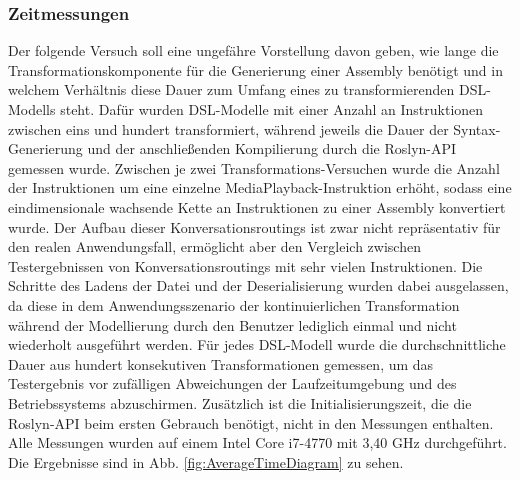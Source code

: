 \subsubsection{Zeitmessungen}
Der folgende Versuch soll eine ungefähre Vorstellung davon geben, wie lange die Transformationskomponente für die Generierung einer Assembly benötigt und in welchem Verhältnis diese Dauer zum Umfang eines zu transformierenden DSL-Modells steht. Dafür wurden DSL-Modelle mit einer Anzahl an Instruktionen zwischen eins und hundert transformiert, während jeweils die Dauer der Syntax-Generierung und der anschließenden Kompilierung durch die Roslyn-API gemessen wurde. Zwischen je zwei Transformations-Versuchen wurde die Anzahl der Instruktionen um eine einzelne MediaPlayback-Instruktion erhöht, sodass eine eindimensionale wachsende Kette an Instruktionen zu einer Assembly konvertiert wurde. Der Aufbau dieser Konversationsroutings ist zwar nicht repräsentativ für den realen Anwendungsfall, ermöglicht aber den Vergleich zwischen Testergebnissen von Konversationsroutings mit sehr vielen Instruktionen. Die Schritte des Ladens der Datei und der Deserialisierung wurden dabei ausgelassen, da diese in dem Anwendungsszenario der kontinuierlichen Transformation während der Modellierung durch den Benutzer lediglich einmal und nicht wiederholt ausgeführt werden. Für jedes DSL-Modell wurde die durchschnittliche Dauer aus hundert konsekutiven Transformationen gemessen, um das Testergebnis vor zufälligen Abweichungen der Laufzeitumgebung und des Betriebssystems abzuschirmen. Zusätzlich ist die Initialisierungszeit, die die Roslyn-API beim ersten Gebrauch benötigt, nicht in den Messungen enthalten. Alle Messungen wurden auf einem Intel Core i7-4770 mit 3,40 GHz durchgeführt. Die Ergebnisse sind in Abb. \ref{fig:AverageTimeDiagram} zu sehen. 


